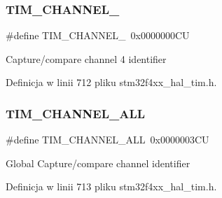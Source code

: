 \subsubsection{\texorpdfstring{T\+I\+M\+\_\+\+C\+H\+A\+N\+N\+E\+L\+\_}{TIM\_CHANNEL\_4}}
{\footnotesize\ttfamily \#define T\+I\+M\+\_\+\+C\+H\+A\+N\+N\+E\+L\+\_~0x0000000\+CU}

Capture/compare channel 4 identifier 

Definicja w linii 712 pliku stm32f4xx\+\_\+hal\+\_\+tim.\+h.

\mbox{\label{group___t_i_m___channel_ga6abf8f9fc695b79d8781ca082dfb48bc}} 
\subsubsection{\texorpdfstring{T\+I\+M\+\_\+\+C\+H\+A\+N\+N\+E\+L\+\_\+\+A\+LL}{TIM\_CHANNEL\_ALL}}
{\footnotesize\ttfamily \#define T\+I\+M\+\_\+\+C\+H\+A\+N\+N\+E\+L\+\_\+\+A\+LL~0x0000003\+CU}

Global Capture/compare channel identifier 

Definicja w linii 713 pliku stm32f4xx\+\_\+hal\+\_\+tim.\+h.

